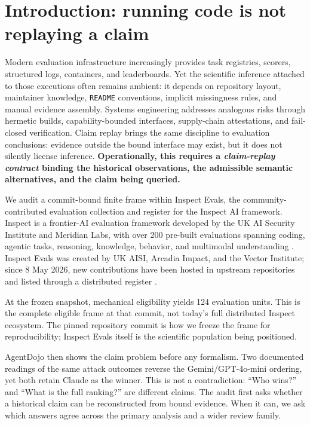 \documentclass{article}
\begin{document}
\section{Introduction: running code is not replaying a claim}

Modern evaluation infrastructure increasingly provides task registries, scorers, structured logs, containers, and leaderboards.  Yet the scientific inference attached to those executions often remains ambient: it depends on repository layout, maintainer knowledge, \texttt{README} conventions, implicit missingness rules, and manual evidence assembly.  Systems engineering addresses analogous risks through hermetic builds, capability-bounded interfaces, supply-chain attestations, and fail-closed verification.  Claim replay brings the same discipline to evaluation conclusions: evidence outside the bound interface may exist, but it does not silently license inference.  \textbf{Operationally, this requires a \emph{claim-replay contract} binding the historical observations, the admissible semantic alternatives, and the claim being queried.}

We audit a commit-bound finite frame within Inspect Evals, the community-contributed evaluation collection and register for the Inspect AI framework.  Inspect is a frontier-AI evaluation framework developed by the UK AI Security Institute and Meridian Labs, with over 200 pre-built evaluations spanning coding, agentic tasks, reasoning, knowledge, behavior, and multimodal understanding \citep{InspectFramework2026}.  Inspect Evals was created by UK AISI, Arcadia Impact, and the Vector Institute; since 8 May 2026, new contributions have been hosted in upstream repositories and listed through a distributed register \citep{InspectEvalsRepository2026,InspectEvalsRegister2026}.

At the frozen snapshot, mechanical eligibility yields 124 evaluation units.  This is the complete eligible frame at that commit, not today's full distributed Inspect ecosystem.  The pinned repository commit is how we freeze the frame for reproducibility; Inspect Evals itself is the scientific population being positioned.

AgentDojo then shows the claim problem before any formalism.  Two documented readings of the same attack outcomes reverse the Gemini/GPT-4o-mini ordering, yet both retain Claude as the winner.  This is not a contradiction: ``Who wins?'' and ``What is the full ranking?'' are different claims.  The audit first asks whether a historical claim can be reconstructed from bound evidence.  When it can, we ask which answers agree across the primary analysis and a wider review family.
\end{document}
